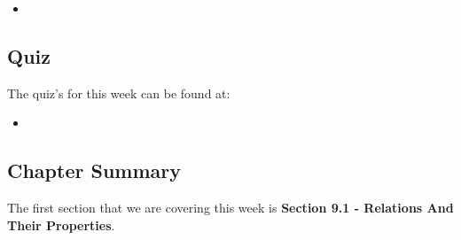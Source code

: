 \begin{itemize}
    \item {}
\end{itemize}

\subsection{Quiz}

The quiz's for this week can be found at:

\begin{itemize}
    \item {}
\end{itemize}

\newpage

\subsection{Chapter Summary}

The first section that we are covering this week is \textbf{Section 9.1 - Relations And Their Properties}.


